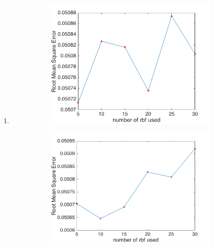 \documentclass{article}
\begin{document}
			\begin{enumerate}[label=(\alph*)]
				\item
				 	\begin{figure}[t]
				 		\caption{Root Mean Square Error against number of radial basis functions used}
				 		\begin{subfigure}{0.5\textwidth}
				 			\includegraphics[width=\linewidth]{images/p1-3-a_5_30.png}
				 			\caption{}
				 			\label{fig:p-1-3-a_a}
			 			\end{subfigure}
				 		\begin{subfigure}{0.5\textwidth}
				 			\includegraphics[width=\linewidth]{images/p1-3-a_5_30_another.png}
				 			\caption{}
				 			\label{fig:p-1-3-a_b}
				 		\end{subfigure}\\

\end{figure}
\end{enumerate}
\end{document}
